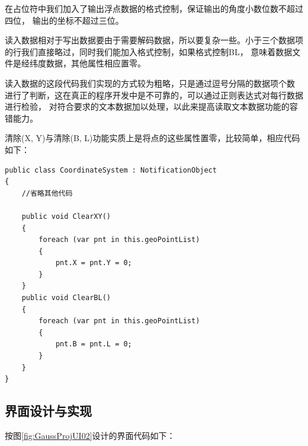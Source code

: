 在占位符中我们加入了输出浮点数据的格式控制，保证输出的角度小数位数不超过四位，
输出的坐标不超过三位。

读入数据相对于写出数据要由于需要解码数据，所以要复杂一些。小于三个数据项
的行我们直接略过，同时我们能加入格式控制，如果格式控制BL，
意味着数据文件是经纬度数据，其他属性相应置零。

读入数据的这段代码我们实现的方式较为粗略，只是通过逗号分隔的数据项个数
进行了判断，这在真正的程序开发中是不可靠的，可以通过正则表达式对每行数据进行检验，
对符合要求的文本数据加以处理，以此来提高读取文本数据功能的容错能力。

清除(X, Y)与清除(B, L)功能实质上是将点的这些属性置零，比较简单，相应代码如下：

\begin{lstlisting}
public class CoordinateSystem : NotificationObject 
{
    //省略其他代码

    public void ClearXY()
    {
        foreach (var pnt in this.geoPointList)
        {
            pnt.X = pnt.Y = 0;
        }
    }
    public void ClearBL()
    {
        foreach (var pnt in this.geoPointList)
        {
            pnt.B = pnt.L = 0;
        }
    }
}
\end{lstlisting}


\subsection{界面设计与实现}

按图\ref{fig:GaussProjUI02}设计的界面代码如下：

